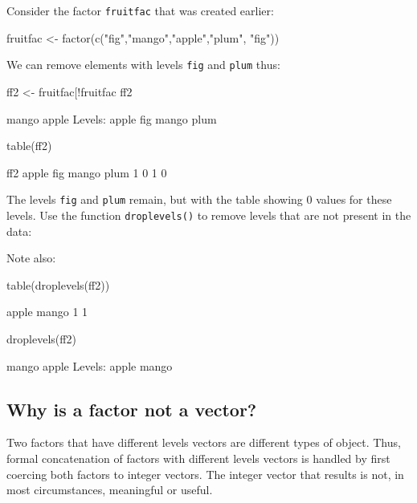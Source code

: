 \documentclass{tufte-book}\usepackage[]{graphicx}\usepackage[]{color}
\newcommand{\txtt}[1]{\texttt{#1}}
\begin{document}
Consider the factor \txtt{fruitfac} that was created earlier:
\begin{Schunk}
\begin{Sinput}
fruitfac <- factor(c("fig","mango","apple","plum", "fig"))
\end{Sinput}
\end{Schunk}
We can remove elements with levels \txtt{fig} and \txtt{plum} thus:
\begin{Schunk}
\begin{Sinput}
ff2 <- fruitfac[!fruitfac %
ff2
\end{Sinput}
\begin{Soutput}
[1] mango apple
Levels: apple fig mango plum
\end{Soutput}
\begin{Sinput}
table(ff2)
\end{Sinput}
\begin{Soutput}
ff2
apple   fig mango  plum 
    1     0     1     0 
\end{Soutput}
\end{Schunk}
The levels \txtt{fig} and \txtt{plum} remain, but with
the table showing 0 values for these levels.  Use the function
\txtt{droplevels()} to remove levels that are not present in
the data:
\begin{marginfigure}
Note also:
\begin{Schunk}
\begin{Sinput}
table(droplevels(ff2))
\end{Sinput}
\begin{Soutput}

apple mango 
    1     1 
\end{Soutput}
\end{Schunk}
\end{marginfigure}
\begin{Schunk}
\begin{Sinput}
droplevels(ff2)
\end{Sinput}
\begin{Soutput}
[1] mango apple
Levels: apple mango
\end{Soutput}
\end{Schunk}

\subsection*{Why is a factor not a vector?}
Two factors   that
have different levels vectors are different types of object.  Thus,
formal concatenation of factors with different levels vectors is
handled by first coercing both factors to integer vectors.  The
integer vector that results is not, in most circumstances, meaningful
or useful.
\end{document}
